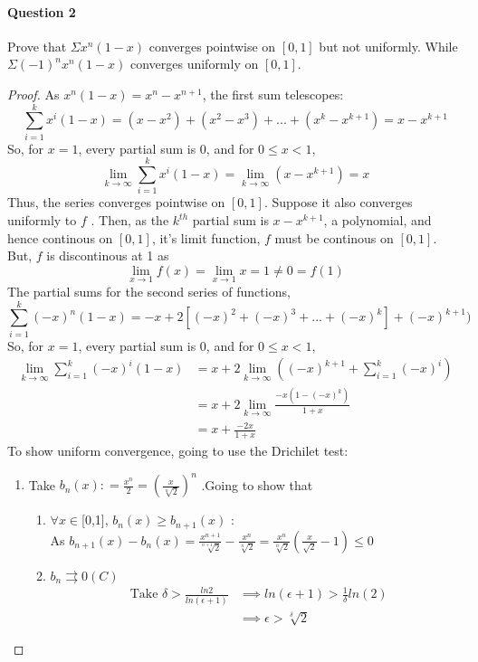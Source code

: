 \documentclass[20pt,a4paper]{extarticle} %
\begin{document}
\paragraph{Question 2}
Prove that $\Sigma x^n(1-x)$ converges pointwise on $[0,1]$ but not uniformly.
While $\Sigma (-1)^nx^n(1-x) $ converges uniformly on $[0,1]$.
\begin{proof}
	As $x^n(1-x) = x^n - x^{n+1}$, the first sum telescopes:
	\[\sum_{i=1}^k x^i(1-x) = (x - x^2) + (x^2 -x^3) +... + (x^k -x^{k+1}) = x- x^{k+1} \]
	So, for $x=1$, every partial sum is 0, and for $0\leq x <1$,
	\[ \lim_{k \to \infty } \sum_{i=1}^k x^i(1-x) = \lim_{k \to \infty }(x - x^{k+1})=x\]
	Thus, the series converges pointwise on $[0,1]$. Suppose it also converges uniformly to $f$ .
	Then, as the $k^{th}$ partial sum is $x-x^{k+1}$, a polynomial, and hence continous on $[0,1]$,
	it's limit function, $f$ must be continous on $[0,1]$. But, $f$ is discontinous at 1 as
	\[ \lim_{x \to 1} f(x) = \lim_{x \to 1} x = 1 \neq 0 = f(1) \]
	The partial sums for the second series of functions,
	\[\sum_{i=1}^k (-x)^n(1-x) = -x +2[(-x)^2 + (-x)^3 + ... + (-x)^k] + (-x)^{k+1})\]
	So, for $x=1$, every partial sum is 0, and for $0\leq x <1$,
	\begin{align*}
		\lim_{k \to \infty } \sum_{i=1}^k (-x)^i(1-x) &= x + 2\lim_{k \to \infty }((-x)^{k+1}+\sum_{i=1}^k (-x)^i ) \\
							      &=x + 2 \lim_{k \to \infty }\frac{-x(1-(-x)^k)}{1+x}\\
							      &=x+\frac{-2x}{1+x}
	\end{align*}
	To show uniform convergence, going to use the Drichilet test:
	\begin{enumerate}[label=\Roman*]
		\item Take $b_n(x): = \frac{x^n}{2} = (\frac{x}{\sqrt[n]{2}})^n$ .Going to show that
			\begin{enumerate}[label=(\roman*)]
				\item $\forall x \in$[0,1], $b_n(x) \geq b_{n+1}(x)$ : \\
					As $b_{n+1}(x) - b_{n}(x) = \frac{x^{n+1}}{\sqrt[n+1]{2}} -
					\frac{x^n}{\sqrt[n]{2}}= \frac{x^n}{\sqrt[n]{2}}(\frac{x}{\sqrt{2}}-1) \leq 0  $
				\item $b_n \rightrightarrows 0(C)$ \\
					\begin{align*}
						\text{ Take } \delta > \frac{ln2}{ln(\epsilon +1)} &\implies ln(\epsilon+1) >
					\frac{1}{\delta}ln(2) \\
					& \implies \epsilon> \sqrt[\delta]{2}

\end{align*}
\end{enumerate}
\end{enumerate}
\end{proof}
\end{document}
